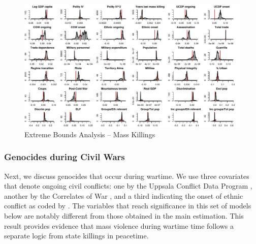 \documentclass[a4paper,12pt]{article}
\begin{document}
\clearpage
\begin{figure}
    \centering
    \includegraphics[width=\textwidth]{images/mk.pdf}
    \caption{Extreme Bounds Analysis -- Mass Killings}
    \label{fig:mk}
\end{figure}
\clearpage

\subsubsection{Genocides during Civil Wars}
\label{sec:civil-wars}

Next, we discuss genocides that occur during wartime. We use three covariates that denote ongoing civil conflicts: one by the Uppsala Conflict Data Program \citep{allansson2017organized,gleditsch2002armed}, another by the Correlates of War \citep{sarkees2010resort}, and a third indicating the onset of ethnic conflict as coded by \citet{cederman2010ethnic}. The variables that reach significance in this set of models below are notably different from those obtained in the main estimation. This result provides evidence that mass violence during wartime time follows a separate logic from state killings in peacetime.

\vspace{1cm}
\end{document}
